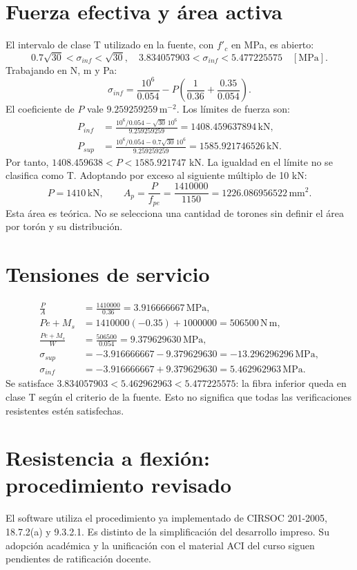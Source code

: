 \documentclass[11pt,a4paper]{article}
\begin{document}
\section{Fuerza efectiva y área activa}
El intervalo de clase T utilizado en la fuente, con $f'_c$ en MPa, es abierto:
\[
0.7\sqrt{30}<\sigma_{inf}<\sqrt{30},\quad
3.834057903<\sigma_{inf}<5.477225575\quad[\mathrm{MPa}].
\]
Trabajando en N, m y Pa:
\[
\sigma_{inf}=\frac{10^6}{0.054}-P\left(\frac1{0.36}+\frac{0.35}{0.054}\right).
\]
El coeficiente de $P$ vale $9.259259259\,\mathrm{m^{-2}}$. Los límites de fuerza son:
\begin{align*}
P_{inf}&=\frac{10^6/0.054-\sqrt{30}\,10^6}{9.259259259}
=1408.459637894\,\mathrm{kN},\\
P_{sup}&=\frac{10^6/0.054-0.7\sqrt{30}\,10^6}{9.259259259}
=1585.921746526\,\mathrm{kN}.
\end{align*}
Por tanto, $1408.459638<P<1585.921747$ kN. La igualdad en el límite no se clasifica como T. Adoptando por exceso al siguiente múltiplo de 10 kN:
\[
\boxed{P=1410\,\mathrm{kN}},\qquad
A_p=\frac P{f_{pe}}=\frac{1410000}{1150}=\boxed{1226.086956522\,\mathrm{mm^2}}.
\]
Esta área es teórica. No se selecciona una cantidad de torones sin definir el área por torón y su distribución.
\section{Tensiones de servicio}
\begin{align*}
\frac PA&=\frac{1410000}{0.36}=3.916666667\,\mathrm{MPa},\\
Pe+M_s&=1410000(-0.35)+1000000=506500\,\mathrm{N\,m},\\
\frac{Pe+M_s}{W}&=\frac{506500}{0.054}=9.379629630\,\mathrm{MPa},\\
\sigma_{sup}&=-3.916666667-9.379629630=\boxed{-13.296296296\,\mathrm{MPa}},\\
\sigma_{inf}&=-3.916666667+9.379629630=\boxed{5.462962963\,\mathrm{MPa}}.
\end{align*}
Se satisface $3.834057903<5.462962963<5.477225575$: la fibra inferior queda en clase T según el criterio de la fuente. Esto no significa que todas las verificaciones resistentes estén satisfechas.
\newpage
\section{Resistencia a flexión: procedimiento revisado}
El software utiliza el procedimiento ya implementado de CIRSOC 201-2005, 18.7.2(a) y 9.3.2.1. Es distinto de la simplificación del desarrollo impreso. Su adopción académica y la unificación con el material ACI del curso siguen pendientes de ratificación docente.
\end{document}

